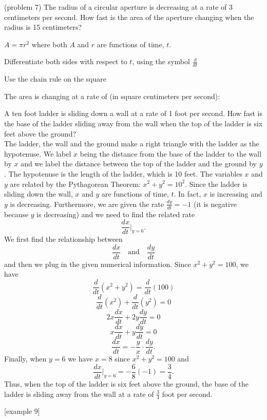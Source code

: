 \documentclass{ximera}
\begin{document}
\begin{problem}(problem 7)
The radius of a circular aperture is decreasing at a rate of 3 centimeters per second.  
How fast is the area of the aperture changing when the radius is 15 centimeters?

\begin{hint}
$A = \pi r^2$ where both $A$ and $r$ are functions of time, $t$.
\end{hint}

\begin{hint}
Differentiate both sides with respect to $t$, using the symbol $\frac{d}{dt}$
\end{hint}
\begin{hint}
Use the chain rule on the square
\end{hint}

The area is changing at a rate of (in square centimeters per second):
\begin{multipleChoice}
\choice{$90 \pi$}
\choice[correct]{$-90 \pi$}
\choice{$-120 \pi$}
\end{multipleChoice}
\end{problem}


\begin{example}[example 8]
A ten foot ladder is sliding down a wall at a rate of 1 foot per second.  How fast is the base of the 
ladder sliding away from the wall when the top of the ladder is six feet above the ground?\\
 The ladder, the wall and the ground make a right triangle with the ladder as the hypotenuse.  
We label $x$ being the distance from the base of the ladder 
to the wall by $x$ and we label  the distance between the top of the ladder and the ground by $y$. 
The hypotenuse is the length of the
ladder, which is 10 feet. The variables $x$ and $y$ are related by the 
Pythagorean Theorem: $x^2 + y^2 = 10^2$. Since the ladder is
sliding down the wall, $x$ and $y$ are functions of time, $t$. 
In fact, $x$ is increasing and $y$ is decreasing. Furthermore, we are given 
the rate $\frac{dy}{dt} = -1$ (it is negative because $y$ is decreasing)
and we need to find the related rate
\[\frac{dx}{dt}\bigg|_{y = 6}.\]
We first find the relationship between 
\[\frac{dx}{dt} \quad \text{and} \quad \frac{dy}{dt}\]
and then we plug in the given numerical information.
Since $x^2 + y^2 = 100$, we have
\[\frac{d}{dt} (x^2 + y^2 ) = \frac{d}{dt}(100)\]
\[\frac{d}{dt} (x^2) +\frac{d}{dt}(y^2 ) = 0\]
\[2x\frac{dx}{dt} + 2y\frac{dy}{dt} = 0\]
\[x\frac{dx}{dt} + y\frac{dy}{dt} = 0\]
\[\frac{dx}{dt} =- \frac{y}{x}\cdot \frac{dy}{dt}. \]
Finally, when $y= 6$ we have $x=8$ since $x^2 + y^2 = 100$ and
\[\frac{dx}{dt}\bigg|_{y = 6}= -\frac68 (-1) = \frac34.\]
Thus, when the top of the ladder is six feet above the ground, 
the base of the ladder is sliding away from the wall 
at a rate of $\frac34$ foot per second.

\begin{center}
\end{center}



\end{example}[example 9]
\end{document}
